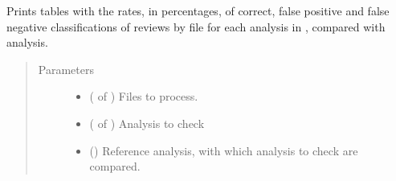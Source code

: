 \documentclass[letterpaper,10pt,english]{sphinxmanual}
\begin{document}
\label{\detokenize{analysis:module-loacore.analysis.polarity_check}}

\begin{fulllineitems}
\label{\detokenize{analysis:loacore.analysis.polarity_check.check_polarity}}
Prints tables with the rates, in percentages, of correct, false positive and false negative classifications of
reviews by file for each analysis in , compared with  analysis.
\begin{quote}\begin{description}
\item[{Parameters}] \leavevmode\begin{itemize}
\item {} 
 ( of {\hyperref[\detokenize{classes:loacore.classes.classes.File}]{}}) \textendash{} Files to process.

\item {} 
 ( of ) \textendash{} Analysis to check

\item {} 
 () \textendash{} Reference analysis, with which analysis to check are compared.

\end{itemize}

\end{description}\end{quote}

\end{fulllineitems}

\end{document}
